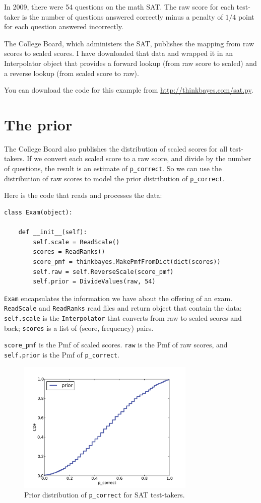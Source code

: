 \documentclass[12pt]{book}
\begin{document}
In 2009, there were 54 questions on the math SAT.  The raw score
for each test-taker is the number of questions answered correctly
minus a penalty of $1/4$ point for each question answered incorrectly.

The College Board, which administers the SAT, publishes the
mapping from raw scores to scaled scores.  I have downloaded that
data and wrapped it in an Interpolator object that provides a forward
lookup (from raw score to scaled) and a reverse lookup (from scaled
score to raw).

You can download the code for this example from
\url{http://thinkbayes.com/sat.py}.


\section{The prior}

The College Board also publishes the distribution of scaled scores
for all test-takers.  If we convert each scaled score to a raw score,
and divide by the number of questions, the result is an estimate
of \verb"p_correct".
So we can use the distribution of raw scores to model the
prior distribution of \verb"p_correct".

Here is the code that reads and processes the data:

\begin{verbatim}
class Exam(object):

    def __init__(self):
        self.scale = ReadScale()
        scores = ReadRanks()
        score_pmf = thinkbayes.MakePmfFromDict(dict(scores))
        self.raw = self.ReverseScale(score_pmf)
        self.prior = DivideValues(raw, 54)
\end{verbatim}

{\tt Exam} encapsulates the information we have about the offering
of an exam.
{\tt ReadScale} and {\tt ReadRanks} read files and return
object that contain the data:
{\tt self.scale} is the {\tt Interpolator} that converts
from raw to scaled scores and back;  {\tt scores} is a list
of (score, frequency) pairs.

\verb"score_pmf" is the Pmf of
scaled scores.   {\tt raw} is the Pmf of raw scores, and
{\tt self.prior} is the Pmf of \verb"p_correct".

\begin{figure}
\centerline{\includegraphics[height=2.5in]{figs/sat_prior.pdf}}
\caption{Prior distribution of {\tt p\_correct} for SAT test-takers.}
\label{fig.satprior}
\end{figure}
\end{document}
